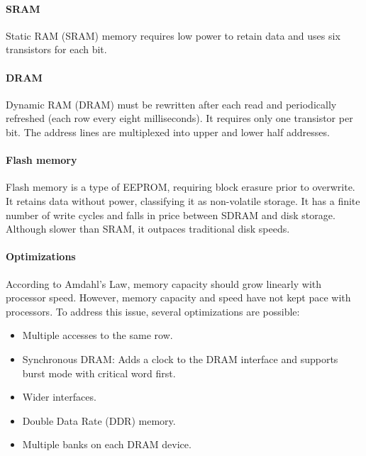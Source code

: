 \paragraph*{SRAM}
Static RAM (SRAM) memory requires low power to retain data and uses six transistors for each bit.

\paragraph*{DRAM}
Dynamic RAM (DRAM) must be rewritten after each read and periodically refreshed (each row every eight milliseconds). 
It requires only one transistor per bit. 
The address lines are multiplexed into upper and lower half addresses.

\paragraph*{Flash memory}
Flash memory is a type of EEPROM, requiring block erasure prior to overwrite. 
It retains data without power, classifying it as non-volatile storage. 
It has a finite number of write cycles and falls in price between SDRAM and disk storage.
Although slower than SRAM, it outpaces traditional disk speeds.

\paragraph*{Optimizations}
According to Amdahl's Law, memory capacity should grow linearly with processor speed.
However, memory capacity and speed have not kept pace with processors.
To address this issue, several optimizations are possible:
\begin{itemize}
    \item Multiple accesses to the same row.
    \item Synchronous DRAM: Adds a clock to the DRAM interface and supports burst mode with critical word first.
    \item Wider interfaces.
    \item Double Data Rate (DDR) memory.
    \item Multiple banks on each DRAM device.
\end{itemize}